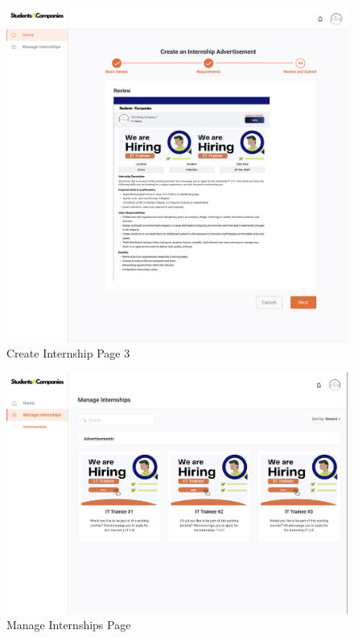 \documentclass{article}
\begin{document}
\begin{figure}[H]
    \centering
    \includegraphics[scale = 0.40]{figures/UserInterfaces/Company/CreateInternship3.png}
    \caption{Create Internship Page 3}
     \centering
\end{figure}
\begin{figure}[H]
    \centering
    \includegraphics[scale = 0.40]{figures/UserInterfaces/Company/ManageInternships.png}
    \caption{Manage Internships Page}
     \centering
\end{figure}
\end{document}
